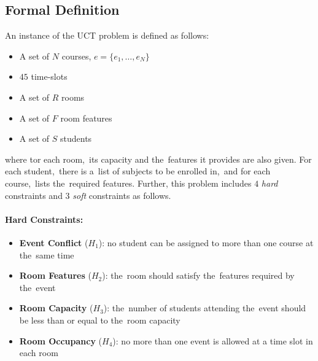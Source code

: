 \subsection{Formal Definition}
An instance of the UCT problem is defined as follows:
\begin{itemize}
    \item A set of $N$ courses, $e = \{ e_1, \dots, e_N\}$
    \item $45$ time-slots
    \item A set of $R$ rooms
    \item A set of $F$ room features
    \item A set of $S$ students
\end{itemize}
where tor each room,~its capacity and the~features it provides are also given. 
For each student,~there is a~list of subjects to be enrolled in,~and for each course,~lists the~required features.
Further, this problem includes $4$ \textit{hard} constraints and $3$ \textit{soft} constraints as follows.
\paragraph{Hard Constraints:}
\begin{itemize}
    \item \textbf{Event Conflict} ($H_1$): no student can be assigned to more than one course at the~same time
    \item \textbf{Room Features} ($H_2$): the~room should satisfy the~features required by the~event
    \item \textbf{Room Capacity} ($H_3$): the~number of students attending the~event should be less than or equal to the~room capacity
    \item \textbf{Room Occupancy} ($H_4$): no more than one event is allowed at a time slot in each room
\end{itemize}
